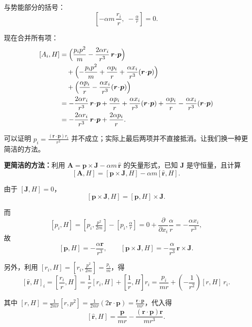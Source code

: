 \begin{question}
\begin{solution}
与势能部分的括号：
\[
[-\alpha m\,\frac{r_i}{r},\; -\tfrac{\alpha}{r}] = 0.
\]

现在合并所有项：
\[
\begin{aligned}
[A_i, H] &=
\Bigl(\frac{p_i p^2}{m} - \frac{2\alpha r_i}{r^3}\,\boldsymbol r\!\cdot\!\boldsymbol p\Bigr) \\
&\quad + \Bigl(-\frac{p_i p^2}{m} + \frac{\alpha p_i}{r} + \frac{\alpha x_i}{r^3}(\boldsymbol r\!\cdot\!\boldsymbol p)\Bigr) \\
&\quad + \Bigl(\frac{\alpha p_i}{r} - \frac{\alpha x_i}{r^3}(\boldsymbol r\!\cdot\!\boldsymbol p)\Bigr) \\
&= -\frac{2\alpha r_i}{r^3}\,\boldsymbol r\!\cdot\!\boldsymbol p
+ \frac{\alpha p_i}{r} + \frac{\alpha x_i}{r^3}(\boldsymbol r\!\cdot\!\boldsymbol p)
+ \frac{\alpha p_i}{r} - \frac{\alpha x_i}{r^3}(\boldsymbol r\!\cdot\!\boldsymbol p) \\
&= -\frac{2\alpha r_i}{r^3}\,\boldsymbol r\!\cdot\!\boldsymbol p
+ \frac{2\alpha p_i}{r}.
\end{aligned}
\]

可以证明 \(\displaystyle p_i = \frac{(\boldsymbol r\!\cdot\!\boldsymbol p) r_i}{r^2}\) 并不成立；实际上最后两项并不直接抵消。让我们换一种更简洁的方法。

\textbf{更简洁的方法：}利用 \(\boldsymbol A = \boldsymbol p \times \boldsymbol J - \alpha m\,\hat{\boldsymbol r}\) 的矢量形式，已知 \(\boldsymbol J\) 是守恒量，且计算
\[
[\boldsymbol A, H] = [\boldsymbol p \times \boldsymbol J, H] - \alpha m [\hat{\boldsymbol r}, H].
\]

由于 \([\boldsymbol J, H]=0\)，
\[
[\boldsymbol p \times \boldsymbol J, H] = [\boldsymbol p, H] \times \boldsymbol J.
\]

而
\[
[p_i, H] = [p_i, \tfrac{p^2}{2m}] - [p_i, \tfrac{\alpha}{r}]
= 0 + \frac{\partial}{\partial x_i}\frac{\alpha}{r}
= -\frac{\alpha x_i}{r^3},
\]
故
\[
[\boldsymbol p, H] = -\frac{\alpha\boldsymbol r}{r^3},\qquad
[\boldsymbol p \times \boldsymbol J, H] = -\frac{\alpha}{r^3}\,\boldsymbol r \times \boldsymbol J.
\]

另外，利用 \([r_i, H] = [r_i, \tfrac{p^2}{2m}] = \frac{p_i}{m}\)，得
\[
[\hat{\boldsymbol r}, H]_i = \left[\frac{r_i}{r}, H\right]
= \frac{1}{r}[r_i,H] + \left[\frac{1}{r}, H\right]r_i
= \frac{p_i}{mr} + \left(-\frac{1}{r^2}\right)[r, H]\,r_i.
\]

其中 \([r, H] = \frac{1}{2mr}[r, p^2] = \frac{1}{2mr}(2\boldsymbol r\!\cdot\!\boldsymbol p)
= \frac{\boldsymbol r\!\cdot\!\boldsymbol p}{mr}\)，代入得
\[
[\hat{\boldsymbol r}, H] = \frac{\boldsymbol p}{mr}
- \frac{(\boldsymbol r\!\cdot\!\boldsymbol p)\boldsymbol r}{mr^3}.
\]


\end{solution}
\end{question}
